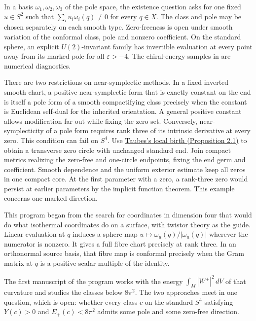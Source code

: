 \documentclass[11pt,letterpaper]{article}
\numberwithin{equation}{section}
\begin{document}
In a basis \(\omega_1,\omega_2,\omega_3\) of the pole space, the
existence question asks for one fixed \(u\in S^2\) such that
\(\sum_i u_i\omega_i(q)\ne0\) for every \(q\in X\).
The class and pole may be chosen separately on each smooth type. Zero-freeness is open under smooth variation of the
conformal class, pole and nonzero coefficient. On the standard sphere,
an explicit \(U(2)\)-invariant family has invertible evaluation at every
point away from its marked pole for all \(\varepsilon>-4\).
The chiral-energy samples in \cite{Baker2026PoleFormsProposal} are
numerical diagnostics.

There are two restrictions on near-symplectic methods. In a fixed
inverted smooth chart, a positive near-symplectic form that is exactly
constant on the end is itself a pole form of a smooth compactifying
class precisely when the constant is Euclidean self-dual for the
inherited orientation. A general positive constant allows modification
far out while fixing the zero set. Conversely, near-symplecticity of a
pole form requires rank three of its intrinsic derivative at every zero.
This condition can fail on \(S^4\). Use
\href{https://doi.org/10.4310/MRL.2006.v13.n4.a6}{Taubes's local birth
(Proposition 2.1)} to obtain a transverse zero circle with unchanged
standard end. Join compact metrics realizing the zero-free and
one-circle endpoints, fixing the end germ and coefficient.
Smooth dependence and the uniform exterior estimate keep all zeros in
one compact core. At the first parameter with a zero, a rank-three zero would
persist at earlier parameters by the implicit function theorem.
This example concerns one marked direction.

This program began from the search for coordinates in dimension four
that would do what isothermal coordinates do on a surface, with twistor
theory as the guide. Linear evaluation at \(q\) induces a sphere map
\(u\mapsto\omega_u(q)/|\omega_u(q)|\) wherever the numerator is nonzero.
It gives a full fibre chart precisely at rank three. In an orthonormal
source basis, that fibre map is conformal precisely when the Gram matrix
at \(q\) is a positive scalar multiple of the identity.

The first manuscript of the program
\cite{Baker2026ChiralMaster} works with the energy
\(\int_M|W^+|^2\,dV\) of that curvature and studies the classes below
\(8\pi^2\). The two approaches meet in one question, which is open:
whether every class \(c\) on the standard \(S^4\) satisfying
\(Y(c)>0\) and \(E_+(c)<8\pi^2\) admits some pole and some
zero-free direction.
\end{document}
